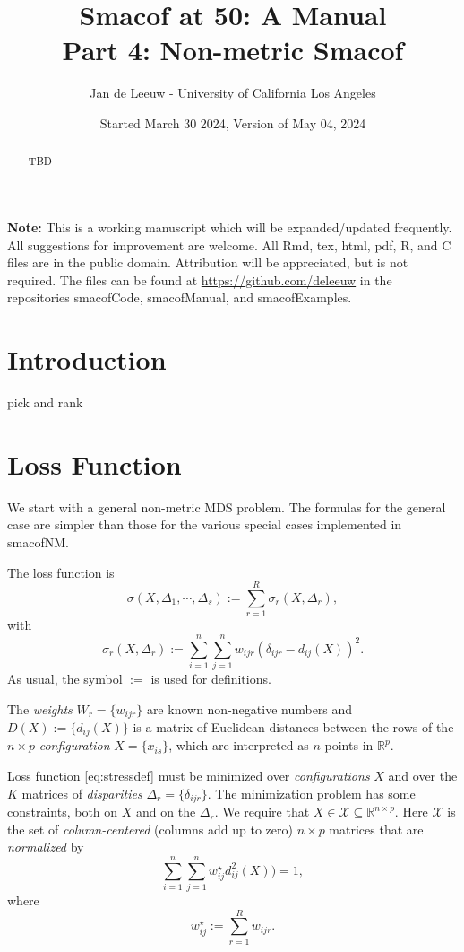 \documentclass[
  12pt,
]{article}
\title{Smacof at 50: A Manual\\
Part 4: Non-metric Smacof}
\author{Jan de Leeuw - University of California Los Angeles}
\date{Started March 30 2024, Version of May 04, 2024}
\newcommand{\sectionbreak}{\clearpage}
\begin{document}
\maketitle
\begin{abstract}
TBD
\end{abstract}

{
\setcounter{tocdepth}{4}
\tableofcontents
}
\textbf{Note:} This is a working manuscript which will be expanded/updated
frequently. All suggestions for improvement are welcome. All Rmd, tex,
html, pdf, R, and C files are in the public domain. Attribution will be
appreciated, but is not required. The files can be found at
\url{https://github.com/deleeuw} in the repositories smacofCode, smacofManual,
and smacofExamples.

\sectionbreak

\section{Introduction}\label{introduction}

pick and rank

\section{Loss Function}\label{loss-function}

We start with a general non-metric MDS problem. The formulas for the general case are simpler than those for the various special cases implemented
in smacofNM.

The loss function is
\begin{equation}
\sigma(X,\Delta_1,\cdots,\Delta_s):=\sum_{r=1}^R\sigma_r(X,\Delta_r),
\label{eq:stressdef}
\end{equation}
with
\begin{equation}
\sigma_r(X,\Delta_r):=\sum_{i=1}^n\sum_{j=1}^n w_{ijr}(\delta_{ijr}-d_{ij}(X))^2.
\label{eq:rstressdef}
\end{equation}
As usual, the symbol \(:=\) is used for definitions.

The \emph{weights} \(W_r=\{w_{ijr}\}\) are known non-negative
numbers and \(D(X):=\{d_{ij}(X)\}\) is a matrix of Euclidean distances
between the rows of the \(n\times p\) \emph{configuration} \(X=\{x_{is}\}\), which are interpreted as \(n\) points in \(\mathbb{R}^p\).

Loss function \eqref{eq:stressdef} must be minimized over \emph{configurations} \(X\) and over the \(K\) matrices of \emph{disparities} \(\Delta_r=\{\delta_{ijr}\}\). The minimization problem has some constraints, both on \(X\) and on the \(\Delta_r\).
We require that \(X\in\mathcal{X}\subseteq\mathbb{R}^{n\times p}\). Here \(\mathcal{X}\) is the set of \emph{column-centered} (columns add up to zero) \(n\times p\) matrices that are \emph{normalized} by
\begin{equation}
\sum_{i=1}^n\sum_{j=1}^n w_{ij}^\star d_{ij}^2(X))=1,
\label{eq:xscale}
\end{equation}
where
\begin{equation}
w_{ij}^\star:=\sum_{r=1}^R w_{ijr}.
\label{eq:wstardef}
\end{equation}
\end{document}
